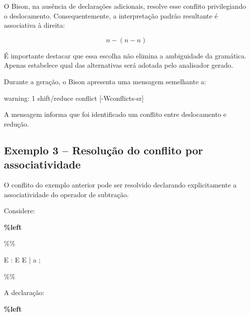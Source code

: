 \documentclass[
  brazilian,
  letterpaper,
]{book}
\newenvironment{Shaded}{\begin{snugshade}}{\end{snugshade}}
\newcommand{\BaseNTok}[1]{\textcolor[rgb]{0.68,0.00,0.00}{#1}}
\newcommand{\CharTok}[1]{\textcolor[rgb]{0.13,0.47,0.30}{#1}}
\newcommand{\KeywordTok}[1]{\textcolor[rgb]{0.00,0.23,0.31}{\textbf{#1}}}
\newcommand{\NormalTok}[1]{\textcolor[rgb]{0.00,0.23,0.31}{#1}}
\newcommand{\StringTok}[1]{\textcolor[rgb]{0.13,0.47,0.30}{#1}}
\theoremstyle{plain}
\theoremstyle{definition}
\theoremstyle{remark}
\begin{document}
O Bison, na ausência de declarações adicionais, resolve esse conflito
privilegiando o deslocamento. Consequentemente, a interpretação padrão
resultante é associativa à direita:

\[
n-(n-n)
\]

É importante destacar que essa escolha não elimina a ambiguidade da
gramática. Apenas estabelece qual das alternativas será adotada pelo
analisador gerado.

Durante a geração, o Bison apresenta uma mensagem semelhante a:

\begin{Shaded}
\begin{Highlighting}[]
\NormalTok{warning: 1 shift/reduce conflict [{-}Wconflicts{-}sr]}
\end{Highlighting}
\end{Shaded}

A mensagem informa que foi identificado um conflito entre deslocamento e
redução.

\subsection{Exemplo 3 -- Resolução do conflito por
associatividade}\label{exemplo-3-resoluuxe7uxe3o-do-conflito-por-associatividade}

O conflito do exemplo anterior pode ser resolvido declarando
explicitamente a associatividade do operador de subtração.

Considere:

\begin{Shaded}
\begin{Highlighting}[]
\KeywordTok{\%left} \CharTok{\textquotesingle{}{-}\textquotesingle{}}

\BaseNTok{\%\%}

\StringTok{E }\NormalTok{: E }\CharTok{\textquotesingle{}{-}\textquotesingle{}}\NormalTok{ E}
\NormalTok{  | }\CharTok{\textquotesingle{}a\textquotesingle{}}
\NormalTok{  ;}

\BaseNTok{\%\%}
\end{Highlighting}
\end{Shaded}

A declaração:

\begin{Shaded}
\begin{Highlighting}[]
\KeywordTok{\%left} \CharTok{\textquotesingle{}{-}\textquotesingle{}}
\end{Highlighting}
\end{Shaded}
\end{document}
